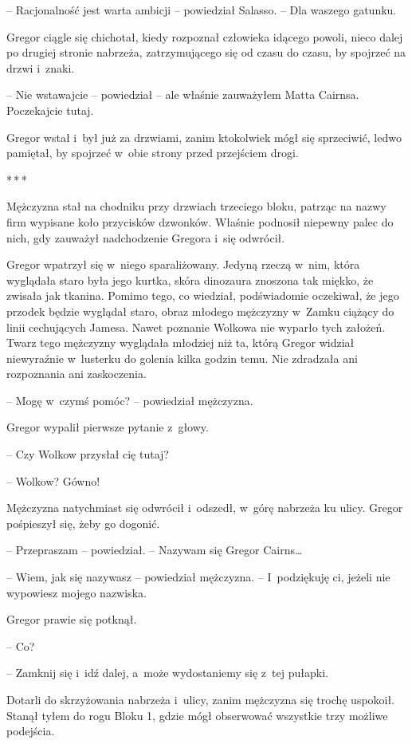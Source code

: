 \documentclass[oneside,polish,12pt,sfheadings]{mwbk}
\newcommand{\threeast}{\bigskip\par\centerline{*\,*\,*}\medskip\par}%
\begin{document}
-- Racjonalność jest warta ambicji -- powiedział Salasso. -- Dla waszego
gatunku.

Gregor ciągle się chichotał, kiedy rozpoznał człowieka idącego powoli,
nieco dalej po drugiej stronie nabrzeża, zatrzymującego się od czasu do
czasu, by spojrzeć na drzwi i~znaki.

-- Nie wstawajcie -- powiedział -- ale właśnie zauważyłem Matta Cairnsa.
Poczekajcie tutaj.

Gregor wstał i~był już za drzwiami, zanim ktokolwiek mógł się
sprzeciwić, ledwo pamiętał, by spojrzeć w~obie strony przed przejściem
drogi.

\threeast

Mężczyzna stał na chodniku przy drzwiach trzeciego bloku, patrząc na
nazwy firm wypisane koło przycisków dzwonków. Właśnie podnosił niepewny
palec do nich, gdy zauważył nadchodzenie Gregora i~się odwrócił.

Gregor wpatrzył się w~niego sparaliżowany. Jedyną rzeczą w~nim, która
wyglądała staro była jego kurtka, skóra dinozaura znoszona tak miękko,
że zwisała jak tkanina. Pomimo tego, co wiedział, podświadomie
oczekiwał, że jego przodek będzie wyglądał staro, obraz młodego
mężczyzny w~Zamku ciążący do linii cechujących Jamesa. Nawet poznanie
Wolkowa nie wyparło tych założeń. Twarz tego mężczyzny wyglądała
młodziej niż ta, którą Gregor widział niewyraźnie w~lusterku do golenia
kilka godzin temu. Nie zdradzała ani rozpoznania ani zaskoczenia.

-- Mogę w~czymś pomóc? -- powiedział mężczyzna.

Gregor wypalił pierwsze pytanie z~głowy. 

-- Czy Wolkow przysłał cię
tutaj?

-- Wolkow? Gówno!

Mężczyzna natychmiast się odwrócił i~odszedł, w~górę nabrzeża ku ulicy.
Gregor pośpieszył się, żeby go dogonić.

-- Przepraszam -- powiedział. -- Nazywam się Gregor Cairns\ldots

-- Wiem, jak się nazywasz -- powiedział mężczyzna. -- I~podziękuję ci,
jeżeli nie wypowiesz mojego nazwiska.

Gregor prawie się potknął. 

-- Co?

-- Zamknij się i~idź dalej, a~może wydostaniemy się z~tej pułapki.

Dotarli do skrzyżowania nabrzeża i~ulicy, zanim mężczyzna się trochę
uspokoił. Stanął tyłem do rogu Bloku 1, gdzie mógł obserwować wszystkie
trzy możliwe podejścia.
\end{document}
